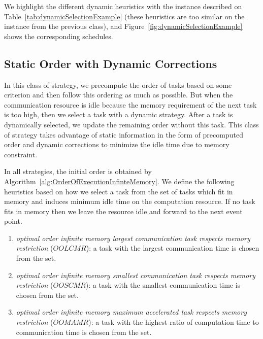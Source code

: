 \documentclass[sigconf]{acmart}
\begin{document}
	
	We highlight the different dynamic heuristics with the instance described on Table~\ref{tab:dynamicSelectionExample} (these heuristics are too similar on the instance from the previous class), and Figure~\ref{fig:dynamicSelectionExample} shows the corresponding schedules.
	
	\subsection{Static Order with Dynamic Corrections}
	
	In this class of strategy, we precompute the order of tasks based on some criterion and then follow this ordering as much as possible. But when the communication resource is idle because the memory requirement of the next task is too high, then we select a task  with a dynamic strategy. After a task is dynamically selected, we update the remaining order without this task. This class of strategy takes advantage of static information in the form of precomputed order and dynamic corrections to minimize the idle time due to memory constraint.
	
	In all strategies, the initial order is obtained by Algorithm~\ref{alg:OrderOfExecutionInfinteMemory}. We define the following heuristics based on how we select a task from the set of tasks which fit in memory and induces minimum idle time on the computation resource. If no task fits in memory then we leave the resource idle and forward to the next event point.
	
	\begin{enumerate}[label=\roman*)]
		\item \textit{optimal order infinite memory largest communication task respects memory restriction} ($OOLCMR$): a task with the largest communication time is chosen from the set.
		\item \textit{optimal order infinite memory smallest communication task respects memory restriction} ($OOSCMR$): a task with the smallest communication time is chosen from the set.
		\item \textit{optimal order infinite memory maximum accelerated task respects memory restriction} ($OOMAMR$): a task  with the highest ratio of computation time to communication time is chosen from the set.
	\end{enumerate}
	
\end{document}
